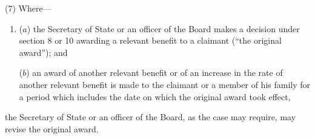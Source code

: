 \documentclass[12pt,a4paper]{article}
\begin{document}
%

(7) Where—
\begin{enumerate}\item[]
($a$) the Secretary of State or an officer of the Board makes a decision under section 8 or 10 awarding a relevant benefit to a claimant (“the original award”); and

($b$) an award of another relevant benefit or of an increase in the rate of another relevant benefit is made to the claimant or a member of his family for a period which includes the date on which the original award took effect,
\end{enumerate}
the Secretary of State or an officer of the Board, as the case may require, may revise the original award.
\end{document}
